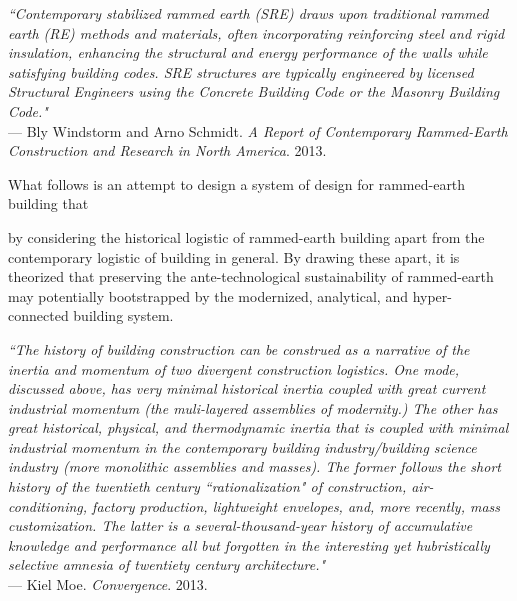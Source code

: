 \begin{flushright}
\small{
\textit{
``Contemporary stabilized rammed earth (SRE) draws upon traditional rammed earth (RE) methods and materials, often incorporating reinforcing steel and rigid insulation, enhancing the structural and energy performance of the walls while satisfying building codes. SRE structures are typically engineered by licensed Structural Engineers using the Concrete Building Code or the Masonry Building Code."}} \\ --- Bly Windstorm and Arno Schmidt. \textit{A Report of Contemporary Rammed-Earth Construction and Research in North America}. 2013.
\end{flushright}

What follows is an attempt to design a system of design for rammed-earth building that

by considering the historical logistic of rammed-earth building apart from the contemporary logistic of building in general. By drawing these apart, it is theorized that preserving the ante-technological sustainability of rammed-earth may  potentially bootstrapped by the modernized, analytical, and hyper-connected building system.

\begin{flushright}
  \small{
  \textit{``The history of building construction can be construed as a narrative of the inertia and momentum of two divergent construction logistics. One mode, discussed above, has very minimal historical inertia coupled with great current industrial momentum (the muli-layered assemblies of modernity.) The other has great historical, physical, and thermodynamic inertia that is coupled with minimal industrial momentum in the contemporary building industry/building science industry (more monolithic assemblies and masses). The former follows the short history of the twentieth century ``rationalization" of construction, air-conditioning, factory production, lightweight envelopes, and, more recently, mass customization. The latter is a several-thousand-year history of accumulative knowledge and performance all but forgotten in the interesting yet hubristically selective amnesia of twentiety century architecture."}}\\ --- Kiel Moe. \textit{Convergence}. 2013.
\end{flushright}
